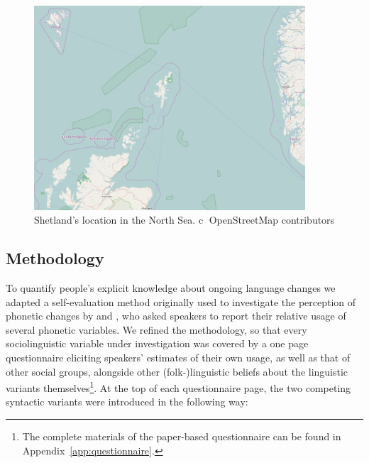 \begin{figure}
\centering
\includegraphics[width=0.9\textwidth]{figure/shetlandcontext}
\caption[Shetland's location in the North Sea]{Shetland's location in the North Sea. \textcircled{c} OpenStreetMap contributors}
\label{fig:shetland}
\end{figure}

\subsection{Methodology}\label{sec:questionnaire}

To quantify people's explicit knowledge about ongoing language changes we adapted a self-evaluation method originally used to investigate the perception of phonetic changes by \citet{Labov1966} and \citet{Trudgill1972}, who asked speakers to report their relative usage of several phonetic variables. We refined the methodology, so that every sociolinguistic variable under investigation was covered by a one page questionnaire eliciting speakers' estimates of their own usage, as well as that of other social groups, alongside other (folk-)linguistic beliefs about the linguistic variants themselves\footnote{The complete materials of the paper-based questionnaire can be found in Appendix~\ref{app:questionnaire}.}. At the top of each questionnaire page, the two competing syntactic variants were introduced in the following way:

